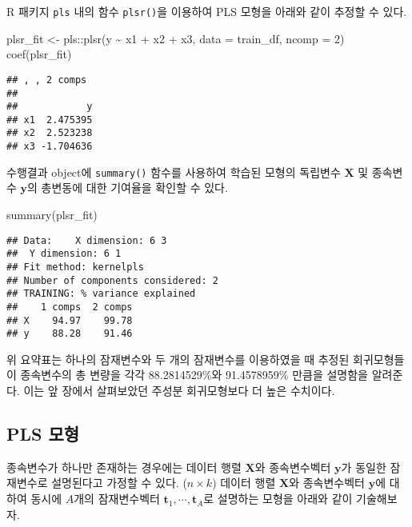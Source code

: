 \documentclass[
]{book}
\newenvironment{Shaded}{\begin{snugshade}}{\end{snugshade}}
\newcommand{\AttributeTok}[1]{\textcolor[rgb]{0.77,0.63,0.00}{#1}}
\newcommand{\DecValTok}[1]{\textcolor[rgb]{0.00,0.00,0.81}{#1}}
\newcommand{\FunctionTok}[1]{\textcolor[rgb]{0.00,0.00,0.00}{#1}}
\newcommand{\NormalTok}[1]{#1}
\newcommand{\OtherTok}[1]{\textcolor[rgb]{0.56,0.35,0.01}{#1}}
\newcommand{\SpecialCharTok}[1]{\textcolor[rgb]{0.00,0.00,0.00}{#1}}
\begin{document}
R 패키지 \texttt{pls} 내의 함수 \texttt{plsr()}을 이용하여 PLS 모형을 아래와 같이 추정할 수 있다.

\begin{Shaded}
\begin{Highlighting}[]
\NormalTok{plsr\_fit }\OtherTok{\textless{}{-}}\NormalTok{ pls}\SpecialCharTok{::}\FunctionTok{plsr}\NormalTok{(y }\SpecialCharTok{\textasciitilde{}}\NormalTok{ x1 }\SpecialCharTok{+}\NormalTok{ x2 }\SpecialCharTok{+}\NormalTok{ x3, }\AttributeTok{data =}\NormalTok{ train\_df, }\AttributeTok{ncomp =} \DecValTok{2}\NormalTok{)}
\FunctionTok{coef}\NormalTok{(plsr\_fit)}
\end{Highlighting}
\end{Shaded}

\begin{verbatim}
## , , 2 comps
## 
##            y
## x1  2.475395
## x2  2.523238
## x3 -1.704636
\end{verbatim}

수행결과 object에 \texttt{summary()} 함수를 사용하여 학습된 모형의 독립변수 \(\mathbf{X}\) 및 종속변수 \(\mathbf{y}\)의 총변동에 대한 기여율을 확인할 수 있다.

\begin{Shaded}
\begin{Highlighting}[]
\FunctionTok{summary}\NormalTok{(plsr\_fit)}
\end{Highlighting}
\end{Shaded}

\begin{verbatim}
## Data:    X dimension: 6 3 
##  Y dimension: 6 1
## Fit method: kernelpls
## Number of components considered: 2
## TRAINING: % variance explained
##    1 comps  2 comps
## X    94.97    99.78
## y    88.28    91.46
\end{verbatim}

위 요약표는 하나의 잠재변수와 두 개의 잠재변수를 이용하였을 때 추정된 회귀모형들이 종속변수의 총 변량을 각각 88.2814529\%와 91.4578959\% 만큼을 설명함을 알려준다. 이는 앞 장에서 살펴보았던 주성분 회귀모형보다 더 높은 수치이다.

\hypertarget{plsr-model}{%
\subsection{PLS 모형}\label{plsr-model}}

종속변수가 하나만 존재하는 경우에는 데이터 행렬 \(\mathbf{X}\)와 종속변수벡터 \(\mathbf{y}\)가 동일한 잠재변수로 설명된다고 가정할 수 있다. (\(n \times k\)) 데이터 행렬 \(\mathbf{X}\)와 종속변수벡터 \(\mathbf{y}\)에 대하여 동시에 \(A\)개의 잠재변수벡터 \(\mathbf{t}_1, \cdots, \mathbf{t}_A\)로 설명하는 모형을 아래와 같이 기술해보자.
\end{document}
